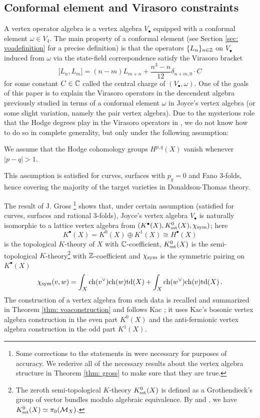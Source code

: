 \documentclass[a4paper, 12pt]{amsart}
\begin{document}
\subsection{Conformal element and Virasoro constraints}
\label{sec: introconformal}

A vertex operator algebra is a vertex algebra $V_\bullet$ equipped with a conformal element $\omega\in V_4$. The main property of a conformal element (see Section \ref{sec: voadefinition} for a precise definition) is that the operators $\{L_n\}_{n\in {\mathbb{Z}}}$ on $V_\bullet$ induced from $\omega$ via the state-field correspondence satisfy the Virasoro bracket
\[\big[L_n,L_m\big] = (n-m)L_{m+n} + \frac{n^3-n}{12}\delta_{n+m,0}\cdot C\]
for some constant $C\in {\mathbb{C}}$ called the central charge of $(V_\bullet, \omega)$. One of the goals of this paper is to explain the Virasoro operators in the descendent algebra previously studied in terms of a conformal element $\omega$ in Joyce's vertex algebra (or some slight variation, namely the pair vertex algebra). Due to the mysterious role that the Hodge degrees play in the Virasoro operators in \cite{moreira}, we do not know how to do so in complete generality, but only under the following assumption:


\begin{assumption}
\label{Ass: vanishing}
We assume that the Hodge cohomology groups $H^{p,q}(X)$ vanish whenever $|p-q|>1$. 
\end{assumption}
This assumption is satisfied for curves, surfaces with $p_g=0$ and Fano 3-folds, hence covering the majority of the target varieties in Donaldson-Thomas theory.

The result of J. Gross \cite{Gr19}\footnote{Some corrections to the statements in \cite{Gr19} were necessary for purposes of accuracy. We rederive all of the necessary results about the vertex algebra structure in Theorem \ref{thm: gross} to make sure that they are true.} shows that, under certain assumption (satisfied for curves, surfaces and rational 3-folds), Joyce's vertex algebra $V_\bullet$ is naturally isomorphic to a lattice vertex algebra from $(K^\bullet(X), K_{\text{sst}}^0(X), \chi_{\text{sym}})$; here
\[K^\bullet(X)=K^0(X)\oplus K^1(X)\cong H^\bullet(X)\] is the topological $K$-theory of $X$ with ${\mathbb{C}}$-coefficient, $K_{\text{sst}}^0(X)$ is the semi-topological $K$-theory\footnote{The zeroth semi-topological $K$-theory $K^0_{\text{sst}}(X)$ is defined as a Grothendieck's group of vector bundles modulo algebraic equivalence. By \cite[Theorem 4.21]{B16} and \cite[Theorem 2.3]{AH18}, we have $K^0_{\text{sst}}(X)\simeq \pi_0(\mathcal{M}_X)$.} with ${\mathbb{Z}}$-coefficient and $\chi_{\text{sym}}$ is the symmetric pairing on $K^\bullet(X)$
\[\chi_{\text{sym}}(v,w)=\int_{X}\mathrm{ch}(v^\vee)\mathrm{ch}(w)\mathrm{td}(X)+\int_{X}\mathrm{ch}(w^\vee)\mathrm{ch}(v)\mathrm{td}(X)\,.\]
The construction of a vertex algebra from such data is recalled and summarized in Theorem \ref{thm: voaconstruction} and follows Kac \cite{Ka98}; it uses Kac's bosonic vertex algebra construction in the even part $K^0(X)$ and the anti-fermionic vertex algebra construction in the odd part $K^1(X)$. 
\end{document}
